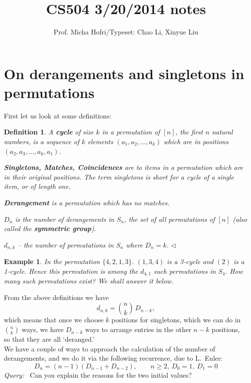 \documentclass[11pt]{article}
\author{Prof. Micha Hofri/Typeset:  Chao Li, Xinyue Liu}
\title{CS504 3/20/2014 notes}
\newtheorem{DEFINITION}{Definition}
\newenvironment{df}{\begin{DEFINITION} \hspace{.30em}  \rm}%
          {\hfill\protect$\lhd$\end{DEFINITION}}
\newtheorem{EXAMPLE}{Example}
\newenvironment{example}{\begin{EXAMPLE} \hspace{.30em} \rm}%
                      {\end{EXAMPLE}}
\begin{document}
\maketitle
\section{On derangements and singletons in permutations}
First let us look at some definitions:\\
\begin{df}
A {\bf cycle} of size $k$ in a permutation of $[n]$, the first $n$ natural
numbers, is a sequence of $k$ elements $(a_1, a_2, \dots, a_k)$ which are 
in positions $(a_2, a_3, \dots, a_k, a_1)$.

{\bf Singletons, Matches, Coincidences} are to items in a
permutation which are in their original positions. The term
singletons is short for a cycle of a single item, or of length one.

{\bf Derangement} is a permutation which has no matches.

$D_n$ is the number of derangements in $S_n$, the set of all permutations
of $[n]$ (also called the {\bf symmetric group}).

$d_{n,k}$ -- the number of permutations in $S_n$ where $D_n=k$.
\end{df}
\begin{example}\label{Mp4.1}
In the permutation
$\{4,2,1,3\}$. $(1,3,4)$ is a 3-cycle and $(2)$ is a 1-cycle. Hence
this permutation is among the $d_{4,1}$ such permutations in $S_4$.  How
many such permutations exist? We shall answer it below.
\end{example}
From the above definitions we have
\[
d_{n,k}=\binom{n}{k}\,D_{n-k},
\]
which means that once  we choose $k$ positions for singletons, which we
can do in $\binom nk$ ways, we have $D_{n-k}$ ways to arrange entries in
the 
other $n-k$ positions, so that they are all `deranged.'\\
We have a couple of ways to approach the calculation of the number of
derangements, and we do it via the following recurrence, due to L.~Euler:
\[
D_n=(n-1)(D_{n-1}+D_{n-2}), \qquad n\geq 2,~ D_0=1,~D_1=0
\]
{\em Query:\ } Can you explain the reasons for the two initial values?
\end{document}
